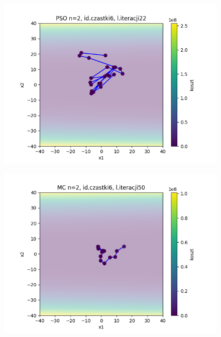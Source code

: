 \documentclass[11pt, a4paper, oneside]{article}
\begin{document}
\begin{figure}[H]
\centering
\begin{minipage}[b]{\dimexpr.5\textwidth-1em}
  \centering
  \includegraphics[width=1\linewidth]{grafiki/Wykresy2d/Zad2_PSO_plot_6.png}
  \label{fig:najepszeRozwiazanie:PSO2}
\end{minipage} \hfill
\begin{minipage}[b]{\dimexpr.5\textwidth-1em}
  \centering
  \includegraphics[width=1\linewidth]{grafiki/Wykresy2d/Zad2_MC_plot_6.png}
  \label{fig:najepszeRozwiazanie:MC2}
\end{minipage}
\end{figure}
\end{document}
